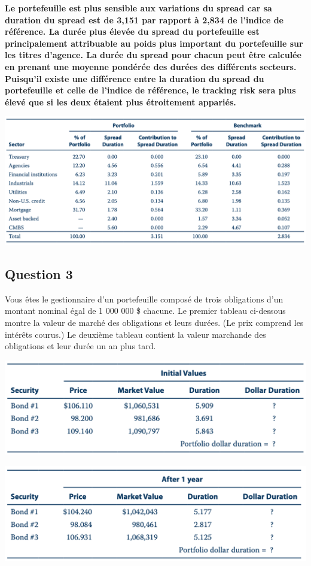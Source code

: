 \documentclass[12pt]{article}
\begin{document}
\begin{itemize}
\textbf{Le portefeuille est plus sensible aux variations du spread car sa duration du spread est de 3,151 par rapport à 2,834 de l’indice de référence. La durée plus élevée du spread du portefeuille est principalement attribuable au poids plus important du portefeuille sur les titres d’agence. La durée du spread pour chacun peut être calculée en prenant une moyenne pondérée des durées des différents secteurs. Puisqu'il existe une différence entre la duration du spread du portefeuille et celle de l'indice de référence,  le tracking risk sera plus élevé que si les deux étaient plus étroitement appariés.}

\includegraphics[width=16cm]{8}

\newpage

\subsection{Question 3}
Vous êtes le gestionnaire d'un portefeuille composé de trois obligations d'un montant nominal égal de 1 000 000 \$ chacune. Le premier tableau ci-dessous montre la valeur de marché des obligations et leurs durées. (Le prix comprend les intérêts courus.) Le deuxième tableau contient la valeur marchande des obligations et leur durée un an plus tard.

\includegraphics[width=14cm]{9}

\includegraphics[width=14cm]{10}


\end{itemize}
\end{document}
